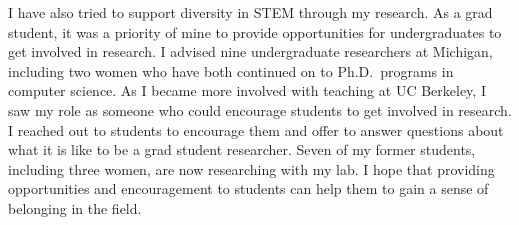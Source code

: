 \documentclass[11pt]{article} %
\begin{document}
I have also tried to support diversity in STEM through my research.
%
As a grad student, it was a priority of mine to provide opportunities for
undergraduates to get involved in research. I advised nine undergraduate
researchers at Michigan, including two women who have both continued on to
Ph.D.\ programs in computer science.
%
As I became more involved with teaching at UC Berkeley, I saw my role as
someone who could encourage students to get involved in research. I reached out
to students to encourage them and offer to answer questions about what it is
like to be a grad student researcher. Seven of my former students, including
three women, are now researching with my lab.
%
I hope that providing opportunities and encouragement to students can help them
to gain  a sense of belonging in  the field.

%
\end{document}
